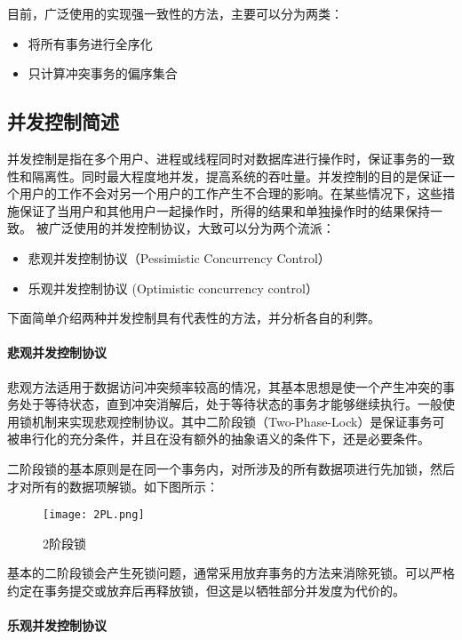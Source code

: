  目前，广泛使用的实现强一致性的方法，主要可以分为两类：

\begin{itemize}
\item 将所有事务进行全序化
\item 只计算冲突事务的偏序集合
\end{itemize}


\subsection{并发控制简述}

并发控制是指在多个用户、进程或线程同时对数据库进行操作时，保证事务的一致性和隔离性。同时最大程度地并发，提高系统的吞吐量。并发控制的目的是保证一个用户的工作不会对另一个用户的工作产生不合理的影响。在某些情况下，这些措施保证了当用户和其他用户一起操作时，所得的结果和单独操作时的结果保持一致。
被广泛使用的并发控制协议，大致可以分为两个流派：

\begin{itemize}
\item 悲观并发控制协议（Pessimistic Concurrency Control）
\item 乐观并发控制协议 (Optimistic concurrency control）
\end{itemize}
下面简单介绍两种并发控制具有代表性的方法，并分析各自的利弊。

\paragraph{悲观并发控制协议}

悲观方法适用于数据访问冲突频率较高的情况，其基本思想是使一个产生冲突的事务处于等待状态，直到冲突消解后，处于等待状态的事务才能够继续执行。一般使用锁机制来实现悲观控制协议。其中二阶段锁（Two-Phase-Lock）是保证事务可被串行化的充分条件，并且在没有额外的抽象语义的条件下，还是必要条件。

二阶段锁的基本原则是在同一个事务内，对所涉及的所有数据项进行先加锁，然后才对所有的数据项解锁。如下图所示：
  \begin{figure}[htb]
  \centering
  \texttt{[image: 2PL.png]}
  \caption{2阶段锁}
  \label{fig:badge}
\end{figure}

基本的二阶段锁会产生死锁问题，通常采用放弃事务的方法来消除死锁。可以严格约定在事务提交或放弃后再释放锁，但这是以牺牲部分并发度为代价的。

\paragraph{乐观并发控制协议}


